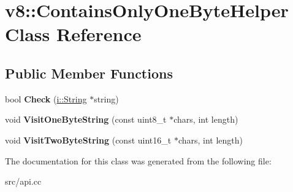\hypertarget{classv8_1_1_contains_only_one_byte_helper}{}\section{v8\+:\+:Contains\+Only\+One\+Byte\+Helper Class Reference}
\label{classv8_1_1_contains_only_one_byte_helper}
\subsection*{Public Member Functions}
\begin{DoxyCompactItemize}
\item 
\hypertarget{classv8_1_1_contains_only_one_byte_helper_a9b25131dc12e92aa8299bf0ca8bfc805}{}bool {\bfseries Check} (\hyperlink{classv8_1_1internal_1_1_string}{i\+::\+String} $\ast$string)\label{classv8_1_1_contains_only_one_byte_helper_a9b25131dc12e92aa8299bf0ca8bfc805}

\item 
\hypertarget{classv8_1_1_contains_only_one_byte_helper_a0dce1e691846cc44ad0e03c69297cd65}{}void {\bfseries Visit\+One\+Byte\+String} (const uint8\+\_\+t $\ast$chars, int length)\label{classv8_1_1_contains_only_one_byte_helper_a0dce1e691846cc44ad0e03c69297cd65}

\item 
\hypertarget{classv8_1_1_contains_only_one_byte_helper_a2ce6fa752fda1b8cb58c00e32a5bae70}{}void {\bfseries Visit\+Two\+Byte\+String} (const uint16\+\_\+t $\ast$chars, int length)\label{classv8_1_1_contains_only_one_byte_helper_a2ce6fa752fda1b8cb58c00e32a5bae70}

\end{DoxyCompactItemize}


The documentation for this class was generated from the following file\+:\begin{DoxyCompactItemize}
\item 
src/api.\+cc\end{DoxyCompactItemize}
